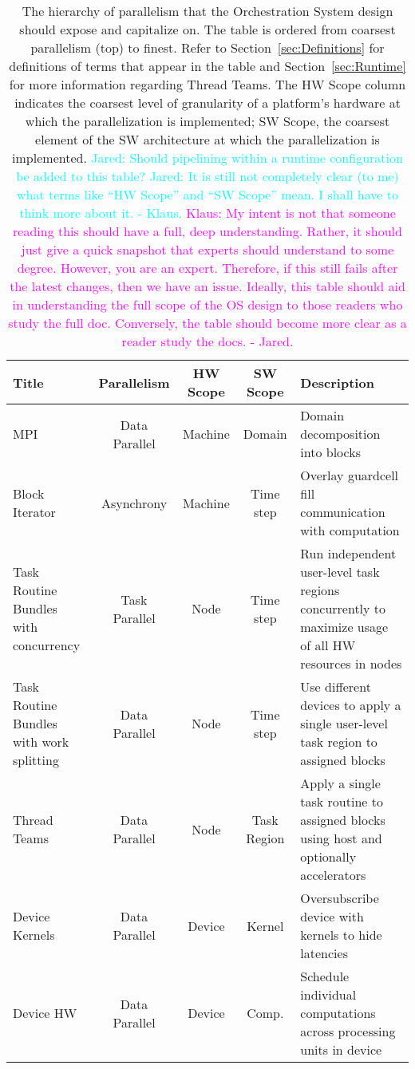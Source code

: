 \documentclass{article}
\newcommand{\Jared}[1]          {\textcolor{cyan}{Jared: #1}}
\newcommand{\JaredRfromKW}[1]   {\textcolor{cyan}{Jared: #1 - Klaus.}}
\newcommand{\KlausRfromJO}[1]   {\textcolor{magenta}{Klaus: #1 - Jared.}}
\newcommand{\ULtaskreg}             {user-level task region\xspace}  %
\newcommand{\ULtaskregs}            {user-level task regions\xspace} %
\begin{document}
\begin{table}[!t]
\label{tab:ParallelHierarchy}
\caption{The hierarchy of parallelism that the Orchestration System design
should expose and capitalize on.  The table is ordered from coarsest parallelism
(top) to finest.  Refer to Section~\ref{sec:Definitions} for definitions of
terms that appear in the table and Section~\ref{sec:Runtime} for more
information regarding Thread Teams.  The HW Scope column indicates the coarsest
level of granularity of a platform's hardware at which the parallelization is
implemented; SW Scope, the coarsest element of the SW architecture at which the
parallelization is implemented.  \Jared{Should pipelining within a
runtime configuration be added to this table?}
\JaredRfromKW{It is still not completely clear (to me) what terms like ``HW Scope''
and ``SW Scope'' mean. I shall have to think more about it.}
\KlausRfromJO{My intent is not that someone reading this should have a full,
deep understanding.  Rather, it should just give a quick snapshot that experts
should understand to some degree.  However, you are an expert.  Therefore, if
this still fails after the latest changes, then we have an issue.  Ideally, this
table should aid in understanding the full scope of the OS design to those
readers who study the full doc.  Conversely, the table should become more clear
as a reader study the docs.}
}

\begin{center}

\begin{tabular}{|p{1.35in}|c|c|c|p{2.25in}|}
\hline
Title & Parallelism & HW Scope & SW Scope & Description\\
\hline
\hline
MPI                              & Data Parallel & Machine & Domain    & Domain decomposition into blocks\\
\hline
Block Iterator                   & Asynchrony    & Machine & Time step & Overlay guardcell fill communication with computation\\
\hline
Task Routine Bundles with
                     concurrency & Task Parallel & Node    & Time step & Run
                     independent \ULtaskregs concurrently to maximize usage of
                     all HW resources in nodes\\
\hline
Task Routine Bundles with
                  work splitting & Data Parallel & Node    & Time step & Use different devices to apply a single \ULtaskreg to assigned blocks\\
\hline
Thread Teams                     & Data Parallel & Node    &Task Region& Apply a single task routine to assigned blocks using host and optionally accelerators\\
\hline
Device Kernels                   & Data Parallel & Device  & Kernel    & Oversubscribe device with kernels to hide latencies\\
\hline
Device HW                        & Data Parallel & Device  & Comp.     & Schedule individual computations across processing units in device\\
\hline
\end{tabular}

\end{center}
\end{table}
\end{document}
